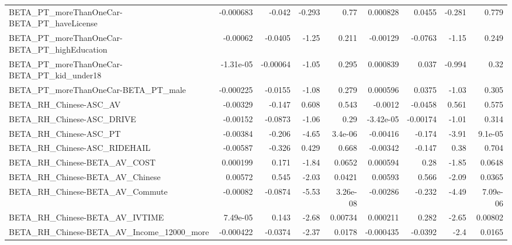 \begin{tabular}{lrrrrrrrr}
BETA\_PT\_moreThanOneCar-BETA\_PT\_haveLicense         &   -0.000683 &       -0.042 &   -0.293 &     0.77 &   0.000828 &      0.0455 &       -0.281 &         0.779 \\
BETA\_PT\_moreThanOneCar-BETA\_PT\_highEducation       &    -0.00062 &      -0.0405 &    -1.25 &    0.211 &   -0.00129 &     -0.0763 &        -1.15 &         0.249 \\
BETA\_PT\_moreThanOneCar-BETA\_PT\_kid\_under18         &   -1.31e-05 &     -0.00064 &    -1.05 &    0.295 &   0.000839 &       0.037 &       -0.994 &          0.32 \\
BETA\_PT\_moreThanOneCar-BETA\_PT\_male                &   -0.000225 &      -0.0155 &    -1.08 &    0.279 &   0.000596 &      0.0375 &        -1.03 &         0.305 \\
BETA\_RH\_Chinese-ASC\_AV                             &    -0.00329 &       -0.147 &    0.608 &    0.543 &    -0.0012 &     -0.0458 &        0.561 &         0.575 \\
BETA\_RH\_Chinese-ASC\_DRIVE                          &    -0.00152 &      -0.0873 &    -1.06 &     0.29 &  -3.42e-05 &    -0.00174 &        -1.01 &         0.314 \\
BETA\_RH\_Chinese-ASC\_PT                             &    -0.00384 &       -0.206 &    -4.65 &  3.4e-06 &   -0.00416 &      -0.174 &        -3.91 &       9.1e-05 \\
BETA\_RH\_Chinese-ASC\_RIDEHAIL                       &    -0.00587 &       -0.326 &    0.429 &    0.668 &   -0.00342 &      -0.147 &         0.38 &         0.704 \\
BETA\_RH\_Chinese-BETA\_AV\_COST                       &    0.000199 &        0.171 &    -1.84 &   0.0652 &   0.000594 &        0.28 &        -1.85 &        0.0648 \\
BETA\_RH\_Chinese-BETA\_AV\_Chinese                    &     0.00572 &        0.545 &    -2.03 &   0.0421 &    0.00593 &       0.566 &        -2.09 &        0.0365 \\
BETA\_RH\_Chinese-BETA\_AV\_Commute                    &    -0.00082 &      -0.0874 &    -5.53 & 3.26e-08 &   -0.00286 &      -0.232 &        -4.49 &      7.09e-06 \\
BETA\_RH\_Chinese-BETA\_AV\_IVTIME                     &    7.49e-05 &        0.143 &    -2.68 &  0.00734 &   0.000211 &       0.282 &        -2.65 &       0.00802 \\
BETA\_RH\_Chinese-BETA\_AV\_Income\_12000\_more          &   -0.000422 &      -0.0374 &    -2.37 &   0.0178 &  -0.000435 &     -0.0392 &         -2.4 &        0.0165 \\

\end{tabular}
